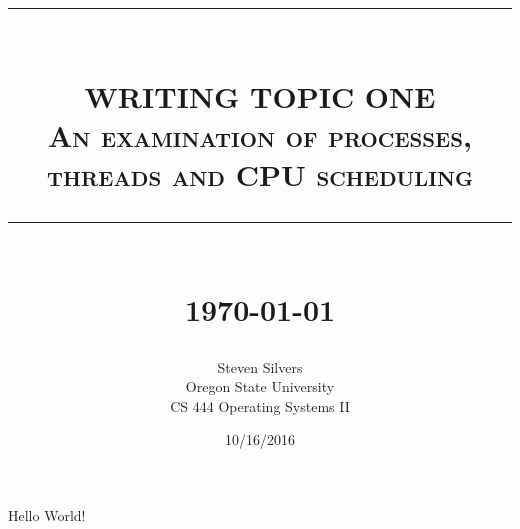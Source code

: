 \documentclass[10pt,serif,draftclsnofoot,onecolumn]{IEEEtran}
\newcommand{\HRule}[1]{\rule{\linewidth}{#1}}
\begin{document}
	\begin{titlepage}


	\title{ \normalsize \textsc{}
			\\ [2.0cm]
			\HRule{0.5pt} \\
			\LARGE \textbf{\uppercase{Writing topic one}}
			\\ \normalsize \textsc{An examination of processes, threads and CPU scheduling}
			\HRule{2pt} \\ [0.5cm]
			\normalsize \today \vspace*{5\baselineskip}}
	\date{10/16/2016}
	
	\author{Steven Silvers \\
			Oregon State University \\
			CS 444 Operating Systems II}
		
	\maketitle
	\end{titlepage}
	\newpage
			Hello World!
\end{document}
